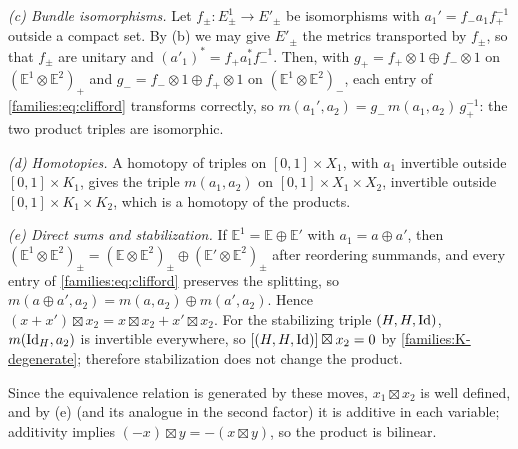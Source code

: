 \emph{(c) Bundle isomorphisms.} Let $f_\pm:E^1_\pm\to E'_\pm$ be isomorphisms with
$a_1'=f_-a_1f_+^{-1}$ outside a compact set. By (b) we may give $E'_\pm$ the
metrics transported by $f_\pm$, so that $f_\pm$ are unitary and
$(a'_1)^*=f_+a_1^*f_-^{-1}$. Then, with $g_+=f_+\otimes1\oplus f_-\otimes1$ on
$(\mathbb E^1\otimes\mathbb E^2)_+$ and $g_-=f_-\otimes1\oplus f_+\otimes1$ on
$(\mathbb E^1\otimes\mathbb E^2)_-$, each entry of \eqref{families:eq:clifford}
transforms correctly, so $m(a_1',a_2)=g_-\,m(a_1,a_2)\,g_+^{-1}$: the two product
triples are isomorphic.

\emph{(d) Homotopies.} A homotopy of triples on $[0,1]\times X_1$, with $a_1$ invertible
outside $[0,1]\times K_1$, gives the triple $m(a_1,a_2)$ on $[0,1]\times X_1\times
X_2$, invertible outside $[0,1]\times K_1\times K_2$, which is a homotopy of the
products.

\emph{(e) Direct sums and stabilization.} If $\mathbb E^1=\mathbb E\oplus\mathbb E'$
with $a_1=a\oplus a'$, then $(\mathbb E^1\otimes\mathbb E^2)_\pm=
(\mathbb E\otimes\mathbb E^2)_\pm\oplus(\mathbb E'\otimes\mathbb E^2)_\pm$ after
reordering summands, and every entry of \eqref{families:eq:clifford} preserves the
splitting, so $m(a\oplus a',a_2)=m(a,a_2)\oplus m(a',a_2)$. Hence
$(x+x')\boxtimes x_2=x\boxtimes x_2+x'\boxtimes x_2$. For the stabilizing triple
$(H,H,\operatorname{Id})$, $m(\operatorname{Id}_H,a_2)$ is invertible everywhere, so $[(H,H,\operatorname{Id})]\boxtimes x_2=0$
by \ref{families:K-degenerate}; therefore stabilization does not change the product.

Since the equivalence relation is generated by these moves, $x_1\boxtimes x_2$ is
well defined, and by (e) (and its analogue in the second factor) it is additive in
each variable; additivity implies $(-x)\boxtimes y=-(x\boxtimes y)$, so the product is
bilinear.

